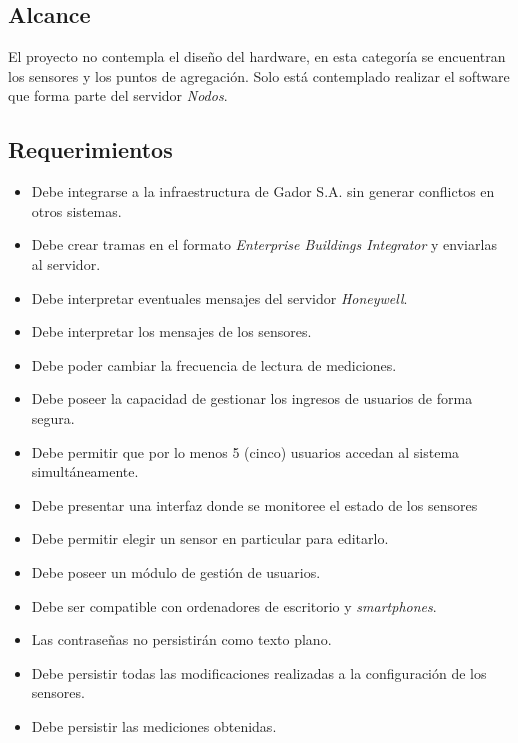 	\subsection{Alcance}
	
		El proyecto no contempla el diseño del hardware, en esta categoría se encuentran los sensores y los puntos de agregación. Solo está contemplado realizar el software que forma parte del servidor \emph{Nodos}.
	
	\subsection{Requerimientos}
	\label{requerimientos}
		\begin{itemize}
			\item Debe integrarse a la infraestructura de Gador S.A. sin generar conflictos en otros sistemas.
			\item Debe crear tramas en el formato \emph{Enterprise Buildings Integrator} y enviarlas al servidor.
			\item Debe interpretar eventuales mensajes del servidor \emph{Honeywell}.
			\item Debe interpretar los mensajes de los sensores.
			\item Debe poder cambiar la frecuencia de lectura de mediciones.
			\item Debe poseer la capacidad de gestionar los ingresos de usuarios de forma segura.
			\item Debe permitir que por lo menos 5 (cinco) usuarios accedan al sistema simultáneamente.
			\item Debe presentar una interfaz donde se monitoree el estado de los sensores
			\item Debe permitir elegir un sensor en particular para editarlo.
			\item Debe poseer un módulo de gestión de usuarios.
			\item Debe ser compatible con ordenadores de escritorio y \emph{smartphones}.
			\item Las contraseñas no persistirán como texto plano.
			\item Debe persistir todas las modificaciones realizadas a la configuración de los sensores.
			\item Debe persistir las mediciones obtenidas.
		\end{itemize}